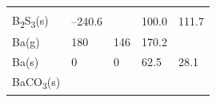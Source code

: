 \documentclass[
  9pt,
]{extbook}
\theoremstyle{definition}
\theoremstyle{definition}
\theoremstyle{definition}
\theoremstyle{remark}
\begin{document}
\begin{longtable}[]{@{}lllll@{}}
\begin{minipage}[t]{0.18\columnwidth}
\end{minipage}\tabularnewline
\begin{minipage}[t]{0.10\columnwidth}\raggedright
B\textsubscript{2}S\textsubscript{3}(s)\strut
\end{minipage} & \begin{minipage}[t]{0.19\columnwidth}\raggedright
--240.6\strut
\end{minipage} & \begin{minipage}[t]{0.20\columnwidth}\raggedright
\strut
\end{minipage} & \begin{minipage}[t]{0.18\columnwidth}\raggedright
100.0\strut
\end{minipage} & \begin{minipage}[t]{0.18\columnwidth}\raggedright
111.7\strut
\end{minipage}\tabularnewline
\begin{minipage}[t]{0.10\columnwidth}\raggedright
Ba(g)\strut
\end{minipage} & \begin{minipage}[t]{0.19\columnwidth}\raggedright
180\strut
\end{minipage} & \begin{minipage}[t]{0.20\columnwidth}\raggedright
146\strut
\end{minipage} & \begin{minipage}[t]{0.18\columnwidth}\raggedright
170.2\strut
\end{minipage} & \begin{minipage}[t]{0.18\columnwidth}\raggedright
\strut
\end{minipage}\tabularnewline
\begin{minipage}[t]{0.10\columnwidth}\raggedright
Ba(s)\strut
\end{minipage} & \begin{minipage}[t]{0.19\columnwidth}\raggedright
0\strut
\end{minipage} & \begin{minipage}[t]{0.20\columnwidth}\raggedright
0\strut
\end{minipage} & \begin{minipage}[t]{0.18\columnwidth}\raggedright
62.5\strut
\end{minipage} & \begin{minipage}[t]{0.18\columnwidth}\raggedright
28.1\strut
\end{minipage}\tabularnewline
\begin{minipage}[t]{0.10\columnwidth}\raggedright
BaCO\textsubscript{3}(s)\strut

\end{minipage}
\end{longtable}
\end{document}
